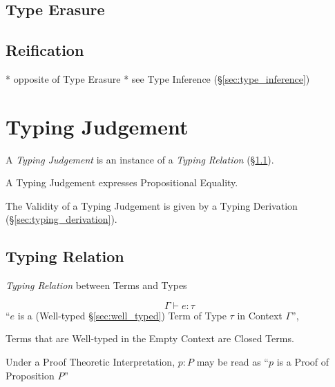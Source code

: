 \subsection{Type Erasure}\label{sec:type_erasure}

\subsection{Reification}\label{sec:reification}

* opposite of Type Erasure
* see Type Inference (\S\ref{sec:type_inference})



\section{Typing Judgement}\label{sec:typing_judgement}

A \emph{Typing Judgement} is an instance of a \emph{Typing Relation}
(\S\ref{sec:typing_relation}).

A Typing Judgement expresses Propositional Equality. %

The Validity of a Typing Judgement is given by a Typing Derivation
(\S\ref{sec:typing_derivation}).



\subsection{Typing Relation}\label{sec:typing_relation}

\emph{Typing Relation} between Terms and Types

\[
  \Gamma \vdash e : \tau
\]
``$e$ is a (Well-typed \S\ref{sec:well_typed}) Term of Type $\tau$ in
Context $\Gamma$'',

Terms that are Well-typed in the Empty Context are Closed Terms.

Under a Proof Theoretic Interpretation, $p : P$ may be read as ``$p$
is a Proof of Proposition $P$''



